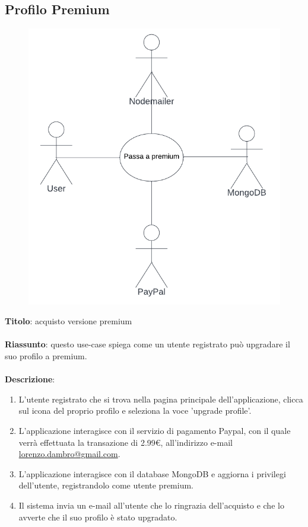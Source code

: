 \subsection{Profilo Premium} \label{req_profilo_premium}
\begin{figure}[!h]
\centering
\includegraphics[scale=0.35]{images/use_case_passa_a_premium.png}
\end{figure}
\noindent
\textbf{Titolo}: acquisto versione premium \\
\\
\textbf{Riassunto}: questo use-case spiega come un utente registrato può upgradare il suo profilo a premium. \\
\\
\textbf{Descrizione}:
\begin{enumerate}
    \item L'utente registrato che si trova nella pagina principale dell'applicazione, clicca sul icona del proprio profilo e seleziona la voce 'upgrade profile'.
    \item L'applicazione interagisce con il servizio di pagamento Paypal, con il quale verrà effettuata la transazione di 2.99\euro, all'indirizzo e-mail \href{mailto:lorenzo.dambro@gmail.com}{lorenzo.dambro@gmail.com}.
    \item L'applicazione interagisce con il database MongoDB e aggiorna i privilegi dell'utente, registrandolo come utente premium.
    \item Il sistema invia un e-mail all'utente che lo ringrazia dell'acquisto e che lo avverte che il suo profilo è stato upgradato.
\end{enumerate}
\newpage

